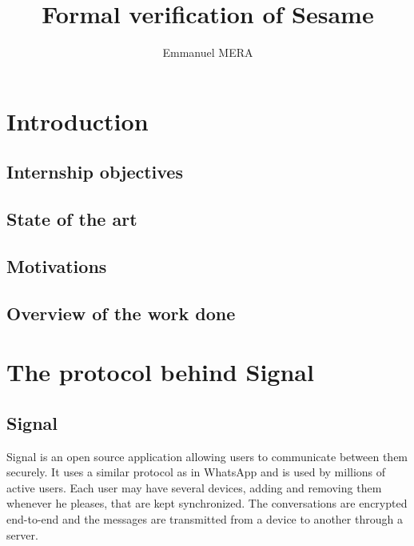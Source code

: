 \documentclass[a4paper, 10pt]{article}
\title{Formal verification of Sesame}
\author{Emmanuel MERA}
\begin{document}
\maketitle


\section{Introduction}
	\subsection{Internship objectives}

	\subsection{State of the art}

	\subsection{Motivations}

	\subsection{Overview of the work done}

\section{The protocol behind Signal}
	\subsection{Signal}
		Signal is an open source application allowing users to communicate between them securely. It uses a similar protocol as in WhatsApp and is used by millions of active users. Each user may have several devices, adding and removing them whenever he pleases, that are kept synchronized. The conversations are encrypted end-to-end and the messages are transmitted from a device to another through a server.
\end{document}
